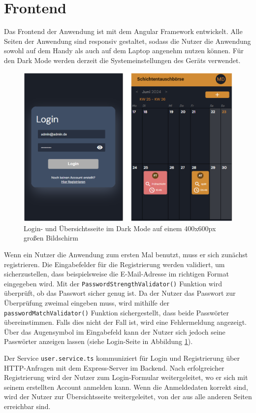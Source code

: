 \section{Frontend}
Das Frontend der Anwendung ist mit dem Angular Framework entwickelt. 
Alle Seiten der Anwendung sind responsiv gestaltet, sodass die Nutzer die Anwendung sowohl auf dem Handy als auch auf dem Laptop angenehm nutzen können. 
Für den Dark Mode werden derzeit die Systemeinstellungen des Geräts verwendet.

\begin{figure}[h]
    \centering
    \includegraphics[clip,width=0.8\linewidth]{images/Login_Home_dark.png}
    \caption[Login- und Übersichtsseite im Dark Mode auf einem 400x600px großen Bildschirm]{Login- und Übersichtsseite im Dark Mode auf einem 400x600px großen Bildschirm}
    \label{Login_Home_dark}
\end{figure}

Wenn ein Nutzer die Anwendung zum ersten Mal benutzt, muss er sich zunächst registrieren. 
Die Eingabefelder für die Registrierung werden validiert, um sicherzustellen, dass beispielsweise die E-Mail-Adresse im richtigen Format eingegeben wird. 
Mit der \texttt{PasswordStrengthValidator()} Funktion wird überprüft, ob das Passwort sicher genug ist. 
Da der Nutzer das Passwort zur Überprüfung zweimal eingeben muss, wird mithilfe der \texttt{passwordMatchValidator()} Funktion sichergestellt, dass beide Passwörter übereinstimmen. 
Falls dies nicht der Fall ist, wird eine Fehlermeldung angezeigt. 
Über das Augensymbol im Eingabefeld kann der Nutzer sich jedoch seine Passwörter anzeigen lassen (siehe Login-Seite in Abbildung \ref{Login_Home_dark}).

Der Service \texttt{user.service.ts} kommuniziert für Login und Registrierung über HTTP-Anfragen mit dem Express-Server im Backend. 
Nach erfolgreicher Registrierung wird der Nutzer zum Login-Formular weitergeleitet, wo er sich mit seinem erstellten Account anmelden kann. 
Wenn die Anmeldedaten korrekt sind, wird der Nutzer zur Übersichtsseite weitergeleitet, von der aus alle anderen Seiten erreichbar sind.

